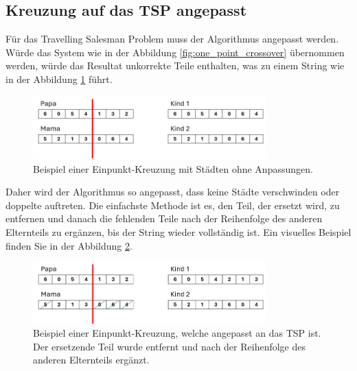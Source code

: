\subsection{Kreuzung auf das TSP angepasst
\label{buch:paper:varalg:subsection:crossover_tsp}}
Für das Travelling Salesman Problem muss der Algorithmus angepasst werden.
Würde das System wie in der Abbildung \ref{fig:one_point_crossover} 
übernommen werden, würde das Resultat unkorrekte Teile enthalten, was zu einem 
String wie in der Abbildung \ref{fig:one_point_crossover_cities} führt.
\begin{figure}
	\centering
	\includegraphics[width=0.8\textwidth]{
		papers/varalg/images/teil3/07GeneticStringCitiesCrossoverStandard.png
	}
	\caption{Beispiel einer Einpunkt-Kreuzung mit Städten ohne Anpassungen.}
	\label{fig:one_point_crossover_cities}
\end{figure}
Daher wird der Algorithmus so angepasst, dass keine Städte verschwinden
oder doppelte auftreten. Die einfachste Methode ist es, den Teil, der ersetzt wird,
zu entfernen und danach die fehlenden Teile nach der Reihenfolge des anderen
Elternteils zu ergänzen, bis der String wieder vollständig ist. Ein visuelles Beispiel
finden Sie in der Abbildung \ref{fig:crossover_order_cities}.
\begin{figure}
	\centering
	\includegraphics[width=0.8\textwidth]{
		papers/varalg/images/teil3/08GeneticStringCitiesCrossoverSimple.png
	}
	\caption{
		Beispiel einer Einpunkt-Kreuzung, welche angepasst an das TSP ist. Der ersetzende Teil wurde entfernt und
		nach der Reihenfolge des anderen Elternteils ergänzt.
	}
	\label{fig:crossover_order_cities}
\end{figure}
